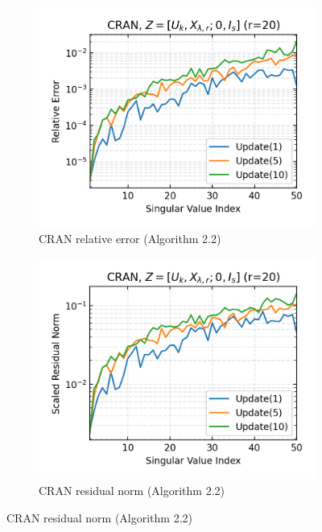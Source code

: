 \begin{figure}[H]
\begin{subfigure}[b]{0.48\textwidth}
  \end{subfigure}
  \hfill
  \begin{subfigure}[b]{0.48\textwidth}
    \centering
    \includegraphics[width=\textwidth]{figures/cran/CRAN_bcg_n_batches_10_k_dims_50_rval_20_rel_err.png}
    \caption{CRAN relative error (Algorithm 2.2)}
  \end{subfigure}
  \hfill
  \begin{subfigure}[b]{0.48\textwidth}
    \centering
    \includegraphics[width=\textwidth]{figures/cran/CRAN_bcg_n_batches_10_k_dims_50_rval_20_res_norm.png}
    \caption{CRAN residual norm (Algorithm 2.2)}
  \end{subfigure}
\end{figure}


